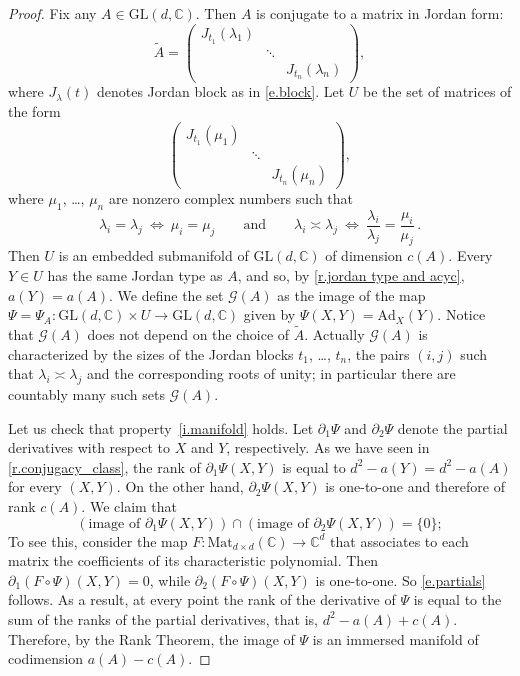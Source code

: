 \documentclass[10pt, a4paper]{amsart}
\theoremstyle{plain}
\theoremstyle{definition}
\theoremstyle{remark}
\theoremstyle{note}
\numberwithin{equation}{section}
\begin{document}
\begin{proof}
Fix any $A \in {\mathrm{GL}}(d,{\mathbb{C}})$.
Then $A$ is conjugate to a matrix in Jordan form:
$$
\tilde{A} =
\left(
\begin{array}{ccc}
J_{t_1}(\lambda_1) &        &                   \\[-2mm]
                   & \ddots &                   \\[-2mm]
                   &        & J_{t_n}(\lambda_n)      
\end{array}
\right), 
$$
where $J_\lambda(t)$ denotes Jordan block as in \eqref{e.block}.
Let $U$ be the set of matrices of the form  
$$
\left(
\begin{array}{ccc}
J_{t_1}(\mu_1) &        &                   \\[-2mm]
               & \ddots &                   \\[-2mm]
               &        & J_{t_n}(\mu_n)      
\end{array}
\right),
$$
where $\mu_1$, \dots, $\mu_n$ are nonzero complex numbers such that
$$
\lambda_i = \lambda_j \ \Leftrightarrow \ \mu_i = \mu_j
\qquad \text{and} \qquad
\lambda_i \asymp \lambda_j \ \Leftrightarrow \ \frac{\lambda_i}{\lambda_j} = \frac{\mu_i}{\mu_j} \, .
$$
Then $U$ is an embedded submanifold of ${\mathrm{GL}}(d,{\mathbb{C}})$ of dimension $c(A)$.
Every $Y \in U$ has the same Jordan type as $A$,
and so, by \cref{r.jordan type and acyc}, $a(Y) = a(A)$.
We define the set ${\mathcal{G}}(A)$ as the image of the map 
$\Psi = \Psi_A \colon {\mathrm{GL}}(d,{\mathbb{C}}) \times U \to {\mathrm{GL}}(d,{\mathbb{C}})$ given by $\Psi(X,Y) = {\mathrm{Ad}}_X (Y)$.
Notice that ${\mathcal{G}}(A)$ does not depend on the choice of $\tilde{A}$.
Actually ${\mathcal{G}}(A)$ is characterized by the sizes of the Jordan blocks $t_1$, \dots, $t_n$,
the pairs $(i,j)$ such that $\lambda_i \asymp \lambda_j$ and the corresponding
roots of unity;
in particular there are countably many such sets ${\mathcal{G}}(A)$.

Let us check that property~\ref{i.manifold} holds.
Let $\partial_1 \Psi$ and $\partial_2 \Psi$ denote the partial derivatives with
respect to $X$ and $Y$, respectively.
As we have seen in \cref{r.conjugacy_class},
the rank of $\partial_1 \Psi (X,Y)$ is equal to $d^2 - a(Y) = d^2 - a(A)$ 
for every $(X,Y)$.
On the other hand, $\partial_2 \Psi (X,Y)$ is one-to-one and therefore of rank $c(A)$.
We claim that
\begin{equation}\label{e.partials}
(\text{image of } \partial_1 \Psi(X,Y)) \cap (\text{image of } \partial_2 \Psi(X,Y)) = \{0\} ;
\end{equation}
To see this, consider the map $F \colon {\mathrm{Mat}}_{d\times d}({\mathbb{C}}) \to {\mathbb{C}}^d$ 
that associates to each matrix the coefficients of its characteristic polynomial.
Then $\partial_1 (F \circ \Psi)(X,Y) = 0$,
while $\partial_2 (F \circ \Psi)(X,Y)$ is one-to-one. 
So \eqref{e.partials} follows.
As a result, at every point the rank of the derivative of $\Psi$ is equal to 
the sum of the ranks of the partial derivatives, that is, $d^2 - a(A) + c(A)$.
Therefore, by the Rank Theorem, the image of $\Psi$ is an immersed manifold of codimension 
$a(A) - c(A)$.
\end{proof}
\end{document}
